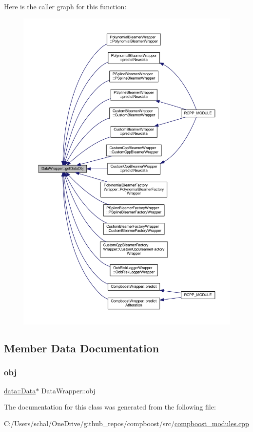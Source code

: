 Here is the caller graph for this function\+:\nopagebreak
\begin{figure}[H]
\begin{center}
\leavevmode
\includegraphics[width=350pt]{class_data_wrapper_a5e2993dd02f11ae2da8db95f942eca60_icgraph}
\end{center}
\end{figure}


\subsection{Member Data Documentation}
\mbox{\label{class_data_wrapper_aa7e20aa2db84194fd86c032583a93774}} 
\subsubsection{\texorpdfstring{obj}{obj}}
{\footnotesize\ttfamily \mbox{\hyperlink{classdata_1_1_data}{data\+::\+Data}}$\ast$ Data\+Wrapper\+::obj\hspace{0.3cm}{\ttfamily [protected]}}



The documentation for this class was generated from the following file\+:\begin{DoxyCompactItemize}
\item 
C\+:/\+Users/schal/\+One\+Drive/github\+\_\+repos/compboost/src/\mbox{\hyperlink{compboost__modules_8cpp}{compboost\+\_\+modules.\+cpp}}\end{DoxyCompactItemize}
